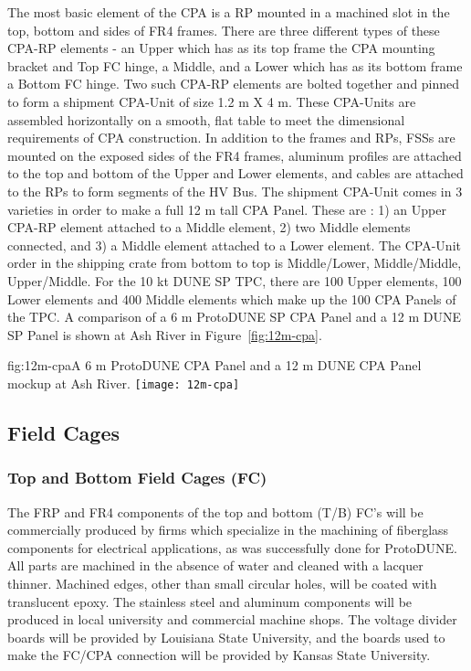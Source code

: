 The most basic element of the CPA is a RP mounted in a machined slot in the top, bottom and sides of FR4 frames.  There are three different types of these CPA-RP elements - an Upper which has as its top frame the CPA mounting bracket and Top FC hinge, a Middle, and a Lower which has as its bottom frame a Bottom FC hinge.  Two such CPA-RP elements are bolted together and pinned to form a shipment CPA-Unit of size 1.2 m X 4 m.  These CPA-Units are assembled horizontally on a smooth, flat table to meet the dimensional requirements of CPA construction.  In addition to the frames and RPs, FSSs are mounted on the exposed sides of the FR4 frames, aluminum profiles are attached to the top and bottom of the Upper and Lower elements, and cables are attached to the RPs to form segments of the HV Bus.  The shipment CPA-Unit comes in 3 varieties in order to make a full 12 m tall CPA Panel.  These are : 1) an Upper CPA-RP element attached to a Middle element, 2) two Middle elements connected, and 3) a Middle element attached to a Lower element.  The CPA-Unit order in the shipping crate from bottom to top is Middle/Lower, Middle/Middle, Upper/Middle.  For the 10 kt DUNE SP TPC, there are 100 Upper elements, 100 Lower elements and 400 Middle elements which make up the 100 CPA Panels of the TPC.
A comparison of a 6 m ProtoDUNE SP CPA Panel and a 12 m DUNE SP Panel is shown at Ash River in Figure~\ref{fig:12m-cpa}.

\begin{dunefigure}{fig:12m-cpa}{A 6 m ProtoDUNE CPA Panel and a 12 m DUNE CPA Panel mockup at Ash River.}
\texttt{[image: 12m-cpa]}
\end{dunefigure}

\subsection{Field Cages}
\label{sec:fdsp-hv-prod-fc}



\subsubsection{Top and Bottom Field Cages (FC)}

The FRP and FR4 components of the top and bottom (T/B) FC's will be commercially produced by firms which specialize in the machining of fiberglass components for electrical applications, as was successfully done for ProtoDUNE. All parts are machined in the absence of water and cleaned with a lacquer thinner. Machined edges, other than small circular holes, will be coated with translucent epoxy. The stainless steel and aluminum components will be produced in local university and commercial machine shops. The voltage divider boards will be provided by Louisiana State University, and the boards used to make the FC/CPA connection will be provided by Kansas State University.

